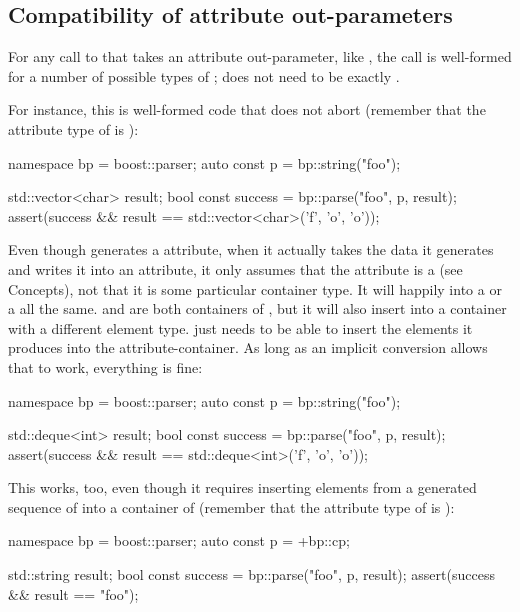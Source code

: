\documentclass{MyBook}
\begin{document}
\subsection{Compatibility of attribute out-parameters}

For any call to  that takes an attribute out-parameter, like , the call is well-formed for a number of possible types of ;  does not need to be exactly \emph{}.

For instance, this is well-formed code that does not abort (remember that the attribute type of  is ):

\begin{code}
namespace bp = boost::parser;
auto const p = bp::string("foo");

std::vector<char> result;
bool const success = bp::parse("foo", p, result);
assert(success && result == std::vector<char>({'f', 'o', 'o'}));
\end{code}

Even though  generates a  attribute, when it actually takes the data it generates and writes it into an attribute, it only assumes that the attribute is a  (see Concepts), not that it is some particular container type. It will happily  into a  or a  all the same.  and  are both containers of , but it will also insert into a container with a different element type.  just needs to be able to insert the elements it produces into the attribute-container. As long as an implicit conversion allows that to work, everything is fine:

\begin{code}
namespace bp = boost::parser;
auto const p = bp::string("foo");

std::deque<int> result;
bool const success = bp::parse("foo", p, result);
assert(success && result == std::deque<int>({'f', 'o', 'o'}));
\end{code}

This works, too, even though it requires inserting elements from a generated sequence of  into a container of  (remember that the attribute type of  is ):

\begin{code}
namespace bp = boost::parser;
auto const p = +bp::cp;

std::string result;
bool const success = bp::parse("foo", p, result);
assert(success && result == "foo");
\end{code}
\end{document}
